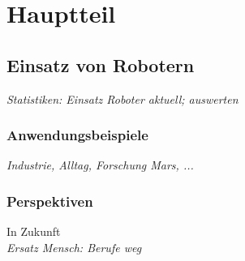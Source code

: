 \chapter{Hauptteil}

\section{Einsatz von Robotern}
\textit{Statistiken: Einsatz Roboter aktuell; auswerten}

\subsection{Anwendungsbeispiele}
\textit{Industrie, Alltag, Forschung Mars, ...}

\subsection{Perspektiven}
In Zukunft \\
\emph{Ersatz Mensch: Berufe weg}
